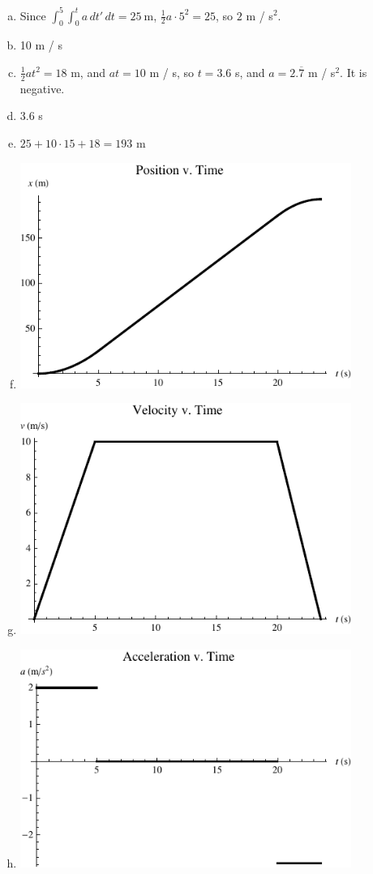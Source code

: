 \documentclass{esg8012pset}
\begin{document}
\begin{solution}
  \begin{enumerate}[a)]
    \item Since $\displaystyle \int_{0}^{5}\int_{0}^{t} a \,d{t'}\,d{t} = 25\ \text{m}$, $\frac{1}{2}a \cdot 5^2 = 25$, so $2$ m / s$^2$.
    \item 10 m / s
    \item $\frac{1}{2}at^2 = 18$ m, and $at = 10$ m / s, so $t = 3.6$ s, and $a = 2.\overline{7}$ m / s$^2$.  It is negative.
    \item 3.6 s
    \item $25 + 10 \cdot 15 + 18 = 193$ m
    \item \includegraphics[width=0.85\textwidth]{ps01_Plot_1}
    \item \includegraphics[width=0.85\textwidth]{ps01_Plot_2}
    \item \includegraphics[width=0.85\textwidth]{ps01_Plot_3}
  \end{enumerate}
\end{solution}
\end{document}
